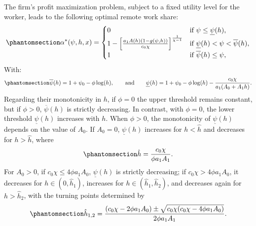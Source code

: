 \documentclass[
  11pt,
  letterpaper,
  DIV=11,
  numbers=noendperiod]{scrartcl}
\theoremstyle{plain}
\theoremstyle{remark}
\begin{document}
The firm's profit maximization problem, subject to a fixed utility level
for the worker, leads to the following optimal remote work
share:\begin{equation}\phantomsection\label{eq-remote-policy-example}{\alpha^{*}(\psi,h,x)=\begin{cases}
        0 & \text{if } \psi \leq \underline{\psi}(h), \\
        1-\left[\frac{a_1A(h)(1-g(\psi,h))}{c_0\chi}\right]^{\frac{1}{\chi-1}} & \text{if } \underline{\psi}(h) < \psi < \overline{\psi}(h), \\
        1 & \text{if } \overline{\psi}(h) \leq \psi,
\end{cases}}\end{equation}
With:\begin{equation}\phantomsection\label{eq-remote-thresholds-example}{\overline{\psi}(h)=1+\psi_0-\phi\log(h),
\qquad \text{and}\qquad \underline{\psi}(h)=1+\psi_0-\phi\log(h)-\frac{c_0\chi}{a_1(A_0+A_1h)}.}\end{equation}
Regarding their monotonicity in \(h\), if \(\phi=0\) the upper threshold
remains constant, but if \(\phi>0\), \(\overline{\psi}(h)\) is strictly
decreasing. In contrast, with \(\phi=0\), the lower threshold
\(\underline{\psi}(h)\) increases with \(h\). When \(\phi>0\), the
monotonicity of \(\underline{\psi}(h)\) depends on the value of \(A_0\).
If \(A_0=0\), \(\underline{\psi}(h)\) increases for \(h<\hat{h}\) and
decreases for \(h>\hat{h}\), where
\begin{equation}\phantomsection\label{eq-hat-h-one-root}{
\hat{h}=\frac{c_0\chi}{\phi a_1A_1}.}\end{equation} For \(A_0>0\), if
\(c_0\chi\le4\phi a_1A_0\), \(\underline{\psi}(h)\) is strictly
decreasing; if \(c_0\chi>4\phi a_1A_0\), it decreases for
\(h\in(0,\hat{h}_{1})\), increases for \(h\in(\hat{h}_1,\hat{h}_2)\),
and decreases again for \(h>\hat{h}_2\), with the turning points
determined by \begin{equation}\phantomsection\label{eq-hat-h-two-roots}{
\hat{h}_{1,2}=\frac{(c_0\chi-2\phi a_1A_0)\pm\sqrt{c_0\chi(c_0\chi-4\phi a_1A_0)}}{2\phi a_1A_1}.}\end{equation}
\end{document}
